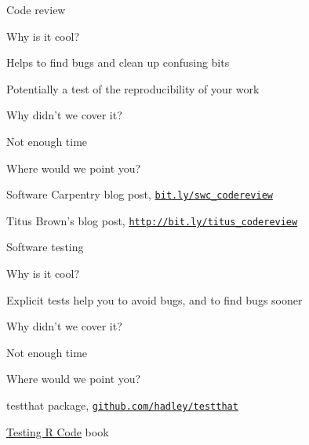 \documentclass[12pt,t]{beamer}
\begin{document}
\begin{frame}[c]{Code review}

  \bbi
\item[] Why is it cool?
  \bi
  \item Helps to find bugs and clean up confusing bits
  \item Potentially a test of the reproducibility of your work
  \ei
\item[] Why didn't we cover it?
    \bi
    \item Not enough time
    \ei
\item[] Where would we point you?
    \bi
  \item Software Carpentry blog post,
    \href{http://bit.ly/swc_codereview}{\tt bit.ly/swc\_codereview}
  \item Titus Brown's blog post,
    \href{http://bit.ly/titus_codereview}{\tt http://bit.ly/titus\_codereview}
   \ei
\ei


\end{frame}




\begin{frame}[c]{Software testing}

  \bbi
\item[] Why is it cool?
  \bi
  \item Explicit tests help you to avoid bugs, and to find bugs sooner
  \ei
\item[] Why didn't we cover it?
    \bi
    \item Not enough time
    \ei
\item[] Where would we point you?
    \bi
  \item testthat package,
    \href{https://github.com/hadley/testthat}{\tt github.com/hadley/testthat}
  \item
    \href{https://www.amazon.com/Testing-Code-Chapman-Hall-CRC/dp/1498763650}{Testing
      R Code} book
   \ei
\ei


\end{frame}
\end{document}
